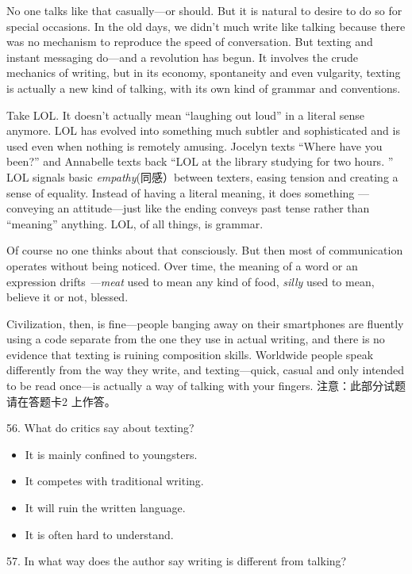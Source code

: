 \documentclass[UTF8,11pt]{ctexart}
\begin{document}
No one talks like that casually—or should. But it is natural to desire to do so for special occasions. In the old days, we didn’t much write like talking because there was no mechanism to reproduce the speed of conversation. But texting and instant messaging do—and a revolution has begun. It involves the crude mechanics of writing, but in its economy, spontaneity and even vulgarity, texting is actually a new kind of talking, with its own kind of grammar and conventions.


Take LOL. It doesn’t actually mean “laughing out loud” in a literal sense anymore. LOL has evolved into something much subtler and sophisticated and is used even when nothing is remotely amusing. Jocelyn texts “Where have you been?” and Annabelle texts back “LOL at the library studying for two hours. ” LOL signals basic\textit{ empathy}(同感）between texters, easing tension and creating a sense of equality. Instead of having a literal meaning, it does something —conveying an attitude—just like the ending conveys past tense rather than “meaning” anything. LOL, of all things, is grammar.


Of course no one thinks about that consciously. But then most of communication operates without being noticed. Over time, the meaning of a word or an expression drifts\textit{ —meat} used to mean any kind of food,\textit{ silly} used to mean, believe it or not, blessed.


Civilization, then, is fine—people banging away on their smartphones are fluently using a code separate from the one they use in actual writing, and there is no evidence that texting is ruining composition skills. Worldwide people speak differently from the way they write, and texting—quick, casual and only intended to be read once—is actually a way of talking with your fingers. 注意：此部分试题请在答题卡2 上作答。


56. What do critics say about texting?


\begin{itemize}[leftmargin=2em,itemsep=.2em,topsep=.4em]\item[A.] It is mainly confined to youngsters.
\item[B.] It competes with traditional writing.
\item[C.] It will ruin the written language.
\item[D.] It is often hard to understand.
\end{itemize}

57. In what way does the author say writing is different from talking?
\end{document}
